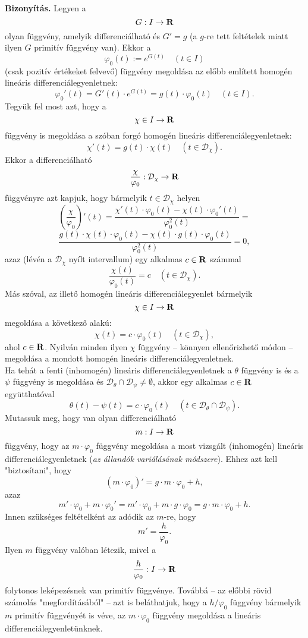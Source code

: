 \textbf{Bizonyítás.} Legyen a
\[
G : I \to \mathbf{R}
\]
olyan függvény, amelyik differenciálható és $G' = g$ (a $g$-re tett  feltételek miatt ilyen $G$ primitív függvény van). Ekkor a
\[
\varphi_0(t) := e^{G(t)} \quad (t \in I)
\]
(csak pozitív értékeket felvevő) függvény megoldása az előbb említett homogén lineáris differenciálegyenletnek:
\[
\varphi_0'(t) = G'(t) \cdot e^{G(t)} = g(t) \cdot \varphi_0(t) \quad (t \in I).
\]
Tegyük fel most azt, hogy a
\[
\chi \in I \to \mathbf{R}
\]
függvény is megoldása a szóban forgó homogén lineáris differenciálegyenletnek:
\[
\chi'(t) = g(t) \cdot \chi(t) \quad (t \in \mathcal{D}_\chi).
\]
Ekkor a differenciálható
\[
\frac{\chi}{\varphi_0} : \mathcal{D}_\chi \to \mathbf{R}
\]
függvényre azt kapjuk, hogy bármelyik $t \in \mathcal{D}_\chi$ helyen
\[
\left( \frac{\chi}{\varphi_0} \right)'(t) = \frac{\chi'(t) \cdot \varphi_0(t) - \chi(t) \cdot \varphi_0'(t)}{\varphi_0^2(t)} =
\]
\[
\frac{g(t) \cdot \chi(t) \cdot \varphi_0(t) - \chi(t) \cdot g(t) \cdot \varphi_0(t)}{\varphi_0^2(t)} = 0,
\]
azaz (lévén a $\mathcal{D}_\chi$ nyílt intervallum) egy alkalmas $c \in \mathbf{R}$ számmal
\[
\frac{\chi(t)}{\varphi_0(t)} = c \quad (t \in \mathcal{D}_\chi).
\]
Más szóval, az illető homogén lineáris differenciálegyenlet bármelyik
\[
\chi \in I \to \mathbf{R}
\]
megoldása a következő alakú:
\[
\chi(t) = c \cdot \varphi_0(t) \quad (t \in \mathcal{D}_\chi),
\]
ahol $c \in \mathbf{R}$. Nyilván minden ilyen $\chi$ függvény -- könnyen ellenőrizhető módon -- megoldása a mondott homogén lineáris differenciálegyenletnek.\\

Ha tehát a fenti (inhomogén) lineáris differenciálegyenletnek a $\theta$ függvény is és a $\psi$ függvény is megoldása és $\mathcal{D}_\theta \cap \mathcal{D}_\psi \neq \emptyset$, akkor egy alkalmas $c \in \mathbf{R}$ együtthatóval
\[
\theta(t) - \psi(t) = c \cdot \varphi_0(t) \quad (t \in \mathcal{D}_\theta \cap \mathcal{D}_\psi).
\]
Mutassuk meg, hogy van olyan differenciálható
\[
m : I \to \mathbf{R}
\]
függvény, hogy az $m \cdot \varphi_0$ függvény megoldása a most vizsgált (inhomogén) lineáris differenciálegyenletnek (\textit{az állandók variálásának módszere}). Ehhez azt kell "biztosítani", hogy
\[
(m \cdot \varphi_0)' = g \cdot m \cdot \varphi_0 + h,
\]
azaz
\[
m' \cdot \varphi_0 + m \cdot \varphi_0' = m' \cdot \varphi_0 + m \cdot g \cdot \varphi_0 = g \cdot m \cdot \varphi_0 + h.
\]
Innen szükséges feltételként az adódik az $m$-re, hogy
\[
m' = \frac{h}{\varphi_0}.
\]
Ilyen $m$ függvény valóban létezik, mivel a
\[
\frac{h}{\varphi_0} : I \to \mathbf{R}
\]
folytonos leképezésnek van primitív függvénye. Továbbá -- az előbbi rövid számolás "megfordításából" -- azt is beláthatjuk, hogy a $h / \varphi_0$ függvény bármelyik $m$ primitív függvényét is véve, az $m \cdot \varphi_0$ függvény megoldása a lineáris differenciálegyenletünknek.\\

